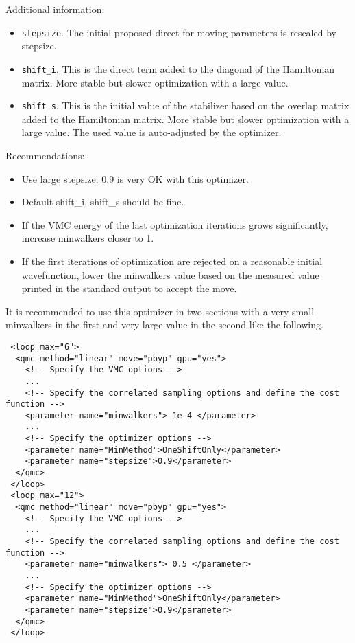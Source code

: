 Additional information:
\begin{itemize}
\item \texttt{stepsize}. The initial proposed direct for moving parameters is rescaled by stepsize.
\item \texttt{shift\_i}. This is the direct term added to the diagonal of the Hamiltonian matrix.
                         More stable but slower optimization with a large value.
\item \texttt{shift\_s}. This is the initial value of the stabilizer based on the overlap matrix added to the Hamiltonian matrix. 
                         More stable but slower optimization with a large value. The used value is auto-adjusted by the optimizer.
\end{itemize}


Recommendations:
\begin{itemize}
  \item Use large stepsize. 0.9 is very OK with this optimizer.
  \item Default shift\_i, shift\_s should be fine.
  \item If the VMC energy of the last optimization iterations grows significantly, increase minwalkers closer to 1.
  \item If the first iterations of optimization are rejected on a reasonable initial wavefunction, 
        lower the minwalkers value based on the measured value printed in the standard output to accept the move.
\end{itemize}

It is recommended to use this optimizer in two sections with a very small minwalkers in the first and very large value in the second like the following.
\begin{lstlisting}
 <loop max="6">
  <qmc method="linear" move="pbyp" gpu="yes">
    <!-- Specify the VMC options -->
    ...
    <!-- Specify the correlated sampling options and define the cost function -->
    <parameter name="minwalkers"> 1e-4 </parameter>
    ...
    <!-- Specify the optimizer options -->
    <parameter name="MinMethod">OneShiftOnly</parameter>
    <parameter name="stepsize">0.9</parameter>
  </qmc>
 </loop>
 <loop max="12">
  <qmc method="linear" move="pbyp" gpu="yes">
    <!-- Specify the VMC options -->
    ...
    <!-- Specify the correlated sampling options and define the cost function -->
    <parameter name="minwalkers"> 0.5 </parameter>
    ...
    <!-- Specify the optimizer options -->
    <parameter name="MinMethod">OneShiftOnly</parameter>
    <parameter name="stepsize">0.9</parameter>
  </qmc>
 </loop>
\end{lstlisting}

